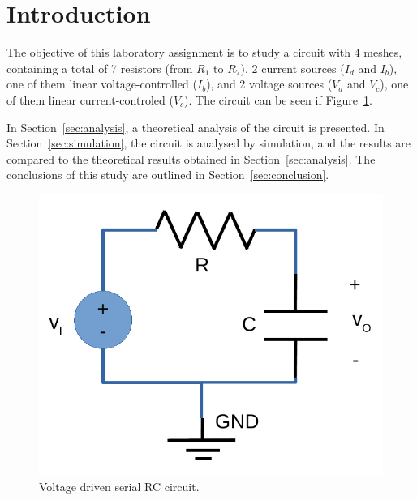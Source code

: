\section{Introduction}
\label{sec:introduction}

The objective of this laboratory assignment is to study a circuit with 4 meshes, containing a total of 7 resistors (from $R_1$ to $R_7$), 2 current sources ($I_d$ and $I_b$), one of them linear voltage-controlled ($I_b$), and 2 voltage sources ($V_a$ and $V_c$), one of them linear current-controled ($V_c$). The circuit can be seen if Figure~\ref{fig:rc}.

In Section~\ref{sec:analysis}, a theoretical analysis of the circuit is
presented. In Section~\ref{sec:simulation}, the circuit is analysed by
simulation, and the results are compared to the theoretical results obtained in
Section~\ref{sec:analysis}. The conclusions of this study are outlined in
Section~\ref{sec:conclusion}.

\begin{figure}[h] \centering
\includegraphics[width=0.4\linewidth]{rc.pdf}
\caption{Voltage driven serial RC circuit.}
\label{fig:rc}
\end{figure}

